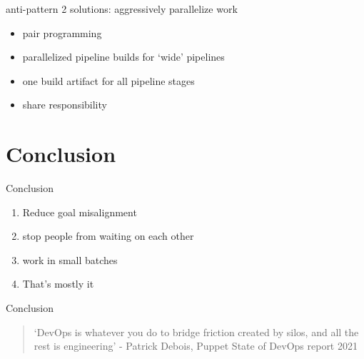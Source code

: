 \documentclass{beamer}
\begin{document}
	\begin{frame}{anti-pattern 2 solutions: aggressively parallelize work}
		\begin{itemize}
			\item pair programming \pause 
			\item parallelized pipeline builds for `wide' pipelines \pause
			\item one build artifact for all pipeline stages \pause
			\item share responsibility
		\end{itemize}
	\end{frame}
	\section{Conclusion}
	\begin{frame}{Conclusion}
		\begin{enumerate}
			\item Reduce goal misalignment \pause
			\item stop people from waiting on each other \pause 
			\item work in small batches \pause
			\item That's mostly it
			
		\end{enumerate}
	\end{frame}
	\begin{frame}{Conclusion}
		\begin{quote}
			`DevOps is whatever you do to bridge friction created by silos, and all the rest is engineering' - Patrick Debois, Puppet State of DevOps report 2021
		\end{quote}
	\end{frame}
\end{document}
